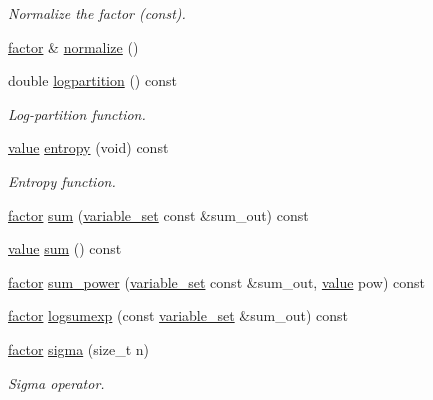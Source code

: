\begin{DoxyCompactItemize}
\begin{DoxyCompactList}\small\item\em Normalize the factor (const). \end{DoxyCompactList}\item 
\hyperlink{classmerlin_1_1factor}{factor} \& \hyperlink{classmerlin_1_1factor_aa206a9e2476ae5000107d5f9eb3115df}{normalize} ()
\item 
double \hyperlink{classmerlin_1_1factor_a8d9d1856e06f43abb75a52eb9ca21585}{logpartition} () const 
\begin{DoxyCompactList}\small\item\em Log-\/partition function. \end{DoxyCompactList}\item 
\hyperlink{classmerlin_1_1factor_a1b14d19e509403448fbef26b003c9281}{value} \hyperlink{classmerlin_1_1factor_a299da4a7718db9c81a9764cdafa9661a}{entropy} (void) const 
\begin{DoxyCompactList}\small\item\em Entropy function. \end{DoxyCompactList}\item 
\hyperlink{classmerlin_1_1factor}{factor} \hyperlink{classmerlin_1_1factor_a0031157664d5275bd1a67aa4f6bec8ea}{sum} (\hyperlink{classmerlin_1_1variable__set}{variable\+\_\+set} const \&sum\+\_\+out) const 
\item 
\hyperlink{classmerlin_1_1factor_a1b14d19e509403448fbef26b003c9281}{value} \hyperlink{classmerlin_1_1factor_a71ac1b23c5741129746dd7b0c8615761}{sum} () const 
\item 
\hyperlink{classmerlin_1_1factor}{factor} \hyperlink{classmerlin_1_1factor_a8bbad2b8a421859a201c6f61bed20978}{sum\+\_\+power} (\hyperlink{classmerlin_1_1variable__set}{variable\+\_\+set} const \&sum\+\_\+out, \hyperlink{classmerlin_1_1factor_a1b14d19e509403448fbef26b003c9281}{value} pow) const 
\item 
\hyperlink{classmerlin_1_1factor}{factor} \hyperlink{classmerlin_1_1factor_a0f748337f4dab76655a0866cbc99efa8}{logsumexp} (const \hyperlink{classmerlin_1_1variable__set}{variable\+\_\+set} \&sum\+\_\+out) const 
\item 
\hyperlink{classmerlin_1_1factor}{factor} \hyperlink{classmerlin_1_1factor_a8eef5d340bf8ef554f17846508131fe6}{sigma} (size\+\_\+t n)
\begin{DoxyCompactList}\small\item\em Sigma operator. \end{DoxyCompactList}\item 

\end{DoxyCompactItemize}
